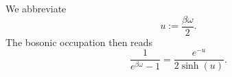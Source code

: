 \documentclass{article}
\begin{document}
We abbreviate
\begin{equation}
u := \frac{\beta\omega}{2} .
\label{eq:u}
\end{equation}
The bosonic occupation then reads
\begin{equation}
\frac{1}{e^{\beta\omega}-1} = \frac{e^{-u}}{2\sinh(u)} .
\label{eq:nb}
\end{equation}
\end{document}

